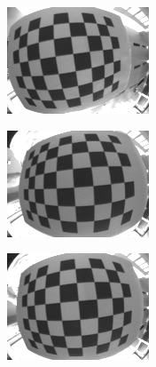 \begin{figure}[h]
\begin{subfigure}[b]{0.2\textwidth}
        \includegraphics[width=\textwidth]{images/camera/2.png}
    \end{subfigure}
	\begin{subfigure}[b]{0.2\textwidth}
        \centering
        \includegraphics[width=\textwidth]{images/camera/3.png}
    \end{subfigure}
	\begin{subfigure}[b]{0.2\textwidth}
        \centering
        \includegraphics[width=\textwidth]{images/camera/4.png}

\end{subfigure}
\end{figure}
